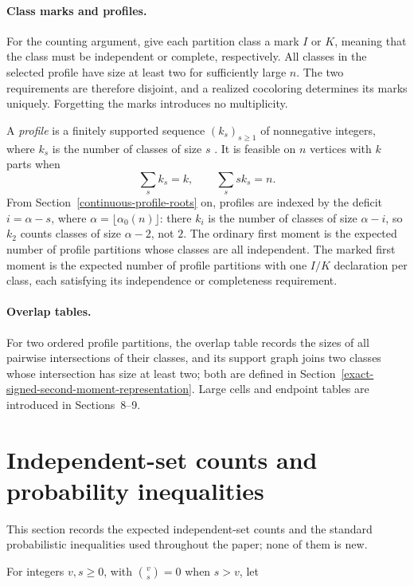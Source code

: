 \documentclass[a4paper,10pt,reqno]{amsart}
\numberwithin{equation}{section}
\theoremstyle{plain}
\theoremstyle{remark}
\begin{document}
\paragraph{Class marks and profiles.}
For the counting argument, give each partition class a mark $I$ or $K$,
meaning that the class must be independent or complete, respectively.
All classes in the selected profile have size at least two for sufficiently
large $n$. The two requirements are therefore disjoint, and a realized
cocoloring determines its marks uniquely. Forgetting the marks introduces
no multiplicity.

A \emph{profile} is a finitely supported sequence $(k_s)_{s\ge1}$ of
nonnegative integers, where $k_s$ is the number of classes of size $s$
\citep[Section~2.2]{heckel-2025-difference}. It is
feasible on $n$ vertices with $k$ parts when
\[
  \sum_s k_s=k,
  \qquad
  \sum_s s k_s=n.
\]
From Section~\ref{continuous-profile-roots} on, profiles are indexed by the
deficit $i=\alpha-s$, where $\alpha=\lfloor\alpha_0(n)\rfloor$: there $k_i$ is
the number of classes of size $\alpha-i$, so $k_2$ counts classes of size
$\alpha-2$, not $2$.
The ordinary first moment is the expected number of profile partitions
whose classes are all independent. The marked first moment is the expected
number of profile partitions with one $I/K$ declaration per class, each
satisfying its independence or completeness requirement.

\paragraph{Overlap tables.}
For two ordered profile partitions, the overlap table records the sizes of
all pairwise intersections of their classes, and its support graph joins two
classes whose intersection has size at least two; both are defined in
Section~\ref{exact-signed-second-moment-representation}. Large cells and
endpoint tables are introduced in Sections~8--9.

\section{Independent-set counts and probability inequalities}\label{notation-and-elementary-facts}

This section records the expected independent-set counts and the standard
probabilistic inequalities used throughout the paper; none of them is new.

For integers \(v,s\ge0\), with \(\binom vs=0\) when \(s>v\), let
\end{document}
